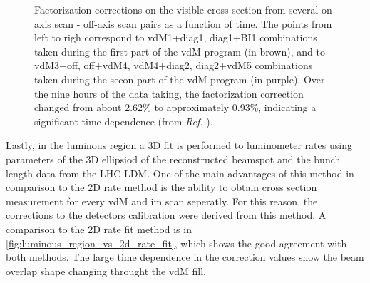 \begin{figure}[!htb]
	\centering
	\caption{Factorization corrections on the visible cross section from several on-axis scan - off-axis scan pairs as a function of time. The points from left to righ correspond to vdM1+diag1, diag1+BI1 combinations taken during the first part of the vdM program (in brown), and to vdM3+off, off+vdM4, vdM4+diag2, diag2+vdM5 combinations taken during the secon part of the vdM program (in purple). Over the nine hours of the data taking, the factorization correction changed from about 2.62\% to approximately 0.93\%, indicating a significant time dependence (from \textit{Ref.} \cite{CMS-DP-2024-068}).}
	\label{fig:2d_rate_fit_xsec_corrections}
\end{figure}

Lastly, in the luminous region a 3D fit is performed to luminometer rates using parameters of the 3D ellipsiod of the reconstructed beamspot and the bunch length data from the LHC LDM. One of the main advantages of this method in comparison to the 2D rate method is the ability to obtain cross section measurement for every vdM and im scan seperatly. For this reason, the corrections to the detectors calibration were derived from this method. A comparison to the 2D rate fit method is in \autoref{fig:luminous_region_vs_2d_rate_fit}, which shows the good agreement with both methods. The large time dependence in the correction values show the beam overlap shape changing throught the vdM fill.

